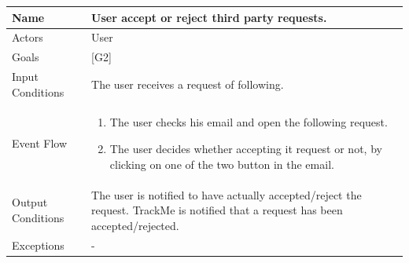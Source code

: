 \documentclass{article}
\begin{document}
\begin{center}
    \begin{tabular}{ | l | p{10cm} |}
    \hline
    Name & User accept or reject third party requests.\\ \hline
    Actors & User\\ \hline
   	Goals & {[G2]}\\ \hline
    Input Conditions & The user receives a request of following.\\ \hline
    Event Flow & \begin{enumerate}
    	\item The user checks his email and open the following request.
		\item The user decides whether accepting it request or not, by clicking on one of the two button in the email.
    \end{enumerate} \\ \hline
    Output Conditions & The user is notified to have actually accepted/reject the request. TrackMe is notified that a request has been accepted/rejected. \\ \hline
    Exceptions & - \\ \hline
    \end{tabular}
\end{center}
\end{document}
